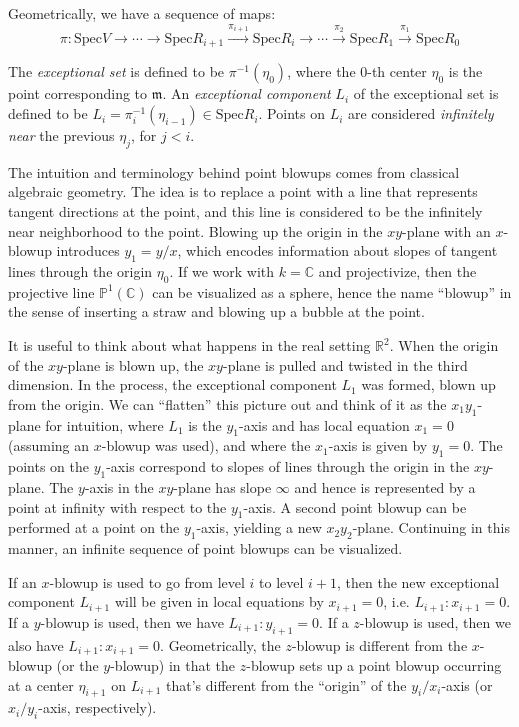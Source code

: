 \documentclass[11pt]{amsart}
\theoremstyle{definition}
\begin{document}
Geometrically, we have a sequence of maps:
\begin{equation*}
\pi: \text{Spec} V \rightarrow \cdots \rightarrow \text{Spec} R_{i+1} \xrightarrow{\pi_{i+1}} \text{Spec} R_i \rightarrow \cdots \xrightarrow{\pi_2} \text{Spec} R_1 \xrightarrow{\pi_1} \text{Spec} R_0
\end{equation*}

The {\it exceptional set} is defined to be $\pi^{-1}(\eta_0)$, where the 0-th center $\eta_0$ is the point corresponding to $\mathfrak{m}$. An {\it exceptional component} $L_i$ of the exceptional set is defined to be $L_i=\pi_i^{-1}(\eta_{i-1})\in\text{Spec}R_i$. Points on $L_i$ are considered {\it infinitely near} the previous $\eta_j$, for $j<i$.

The intuition and terminology behind point blowups comes from classical algebraic geometry. The idea is to replace a point with a line that represents tangent directions at the point, and this line is considered to be the infinitely near neighborhood to the point. Blowing up the origin in the $xy$-plane with an $x$-blowup introduces $y_1=y/x$, which encodes information about slopes of tangent lines through the origin $\eta_0$. If we work with $k=\mathbb{C}$ and projectivize, then the projective line $\mathbb{P}^{1}(\mathbb{C})$ can be visualized as a sphere, hence the name ``blowup'' in the sense of inserting a straw and blowing up a bubble at the point.

It is useful to think about what happens in the real setting $\mathbb{R}^2$. When the origin of the $xy$-plane is blown up, the $xy$-plane is pulled and twisted in the third dimension. In the process, the exceptional component $L_1$ was formed, blown up from the origin. We can ``flatten'' this picture out and think of it as the $x_1y_1$-plane for intuition, where $L_1$ is the $y_1$-axis and has local equation $x_1=0$ (assuming an $x$-blowup was used), and where the $x_1$-axis is given by $y_1=0$. The points on the $y_1$-axis correspond to slopes of lines through the origin in the $xy$-plane. The $y$-axis in the $xy$-plane has slope $\infty$ and hence is represented by a point at infinity with respect to the $y_1$-axis. A second point blowup can be performed at a point on the $y_1$-axis, yielding a new $x_2y_2$-plane. Continuing in this manner, an infinite sequence of point blowups can be visualized.

If an $x$-blowup is used to go from level $i$ to level $i+1$, then the new exceptional component $L_{i+1}$ will be given in local equations by $x_{i+1}=0$, i.e. $L_{i+1}:x_{i+1}=0$. If a $y$-blowup is used, then we have $L_{i+1} : y_{i+1}=0$. If a $z$-blowup is used, then we also have $L_{i+1}:x_{i+1}=0$. Geometrically, the $z$-blowup is different from the $x$-blowup (or the $y$-blowup) in that the $z$-blowup sets up a point blowup occurring at a center $\eta_{i+1}$ on $L_{i+1}$ that's different from the ``origin'' of the $y_i/x_i$-axis (or $x_i/y_i$-axis, respectively).
\end{document}
